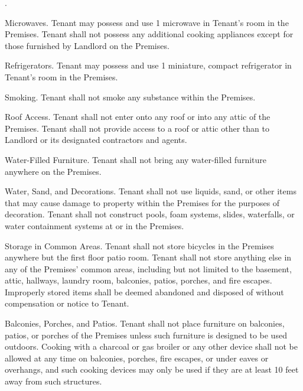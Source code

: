 \documentclass{article}
\begin{document}
\begin{compactList}{.}{}
  \item {\titleStyle Microwaves.} Tenant may possess and use 1 microwave in
  Tenant’s room in the Premises. Tenant shall not possess any additional cooking
  appliances except for those furnished by Landlord on the Premises.

  \item {\titleStyle Refrigerators.} Tenant may possess and use 1 miniature,
  compact refrigerator in Tenant’s room in the Premises.

  \item {\titleStyle Smoking.} Tenant shall not smoke any substance within the
  Premises.

  \item {\titleStyle Roof Access.} Tenant shall not enter onto any roof or into
  any attic of the Premises. Tenant shall not provide access to a roof or attic
  other than to Landlord or its designated contractors and agents.

  \item {\titleStyle Water-Filled Furniture.} Tenant shall not bring any
  water-filled furniture anywhere on the Premises.

  \item {\titleStyle Water, Sand, and Decorations.} Tenant shall not use
  liquids, sand, or other items that may cause damage to property within the
  Premises for the purposes of decoration. Tenant shall not construct pools,
  foam systems, slides, waterfalls, or water containment systems at or in the
  Premises.

  \item {\titleStyle Storage in Common Areas.} Tenant shall not store bicycles
  in the Premises anywhere but the first floor patio room. Tenant shall not
  store anything else in any of the Premises’ common areas, including but not
  limited to the basement, attic, hallways, laundry room, balconies, patios,
  porches, and fire escapes. Improperly stored items shall be deemed abandoned
  and disposed of without compensation or notice to Tenant.

  \item {\titleStyle Balconies, Porches, and Patios.} Tenant shall not place
  furniture on balconies, patios, or porches of the Premises unless such
  furniture is designed to be used outdoors. Cooking with a charcoal or gas
  broiler or any other device shall not be allowed at any time on balconies,
  porches, fire escapes, or under eaves or overhangs, and such cooking devices
  may only be used if they are at least 10 feet away from such structures.


\end{compactList}
\end{document}
